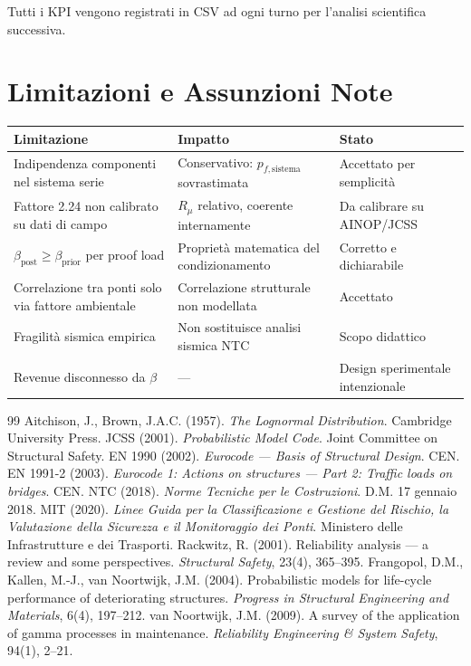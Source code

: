 \documentclass[11pt,a4paper]{article}
\begin{document}
Tutti i KPI vengono registrati in CSV ad ogni turno per l'analisi scientifica successiva.

\section{Limitazioni e Assunzioni Note}

\begin{center}
\begin{tabular}{p{4cm}p{5.5cm}p{3cm}}
\toprule
\textbf{Limitazione} & \textbf{Impatto} & \textbf{Stato} \\
\midrule
Indipendenza componenti nel sistema serie & Conservativo: $p_{f,\text{sistema}}$ sovrastimata & Accettato per semplicità \\
Fattore 2.24 non calibrato su dati di campo & $R_\mu$ relativo, coerente internamente & Da calibrare su AINOP/JCSS \\
$\beta_{\text{post}} \geq \beta_{\text{prior}}$ per proof load & Propriet\`a matematica del condizionamento & Corretto e dichiarabile \\
Correlazione tra ponti solo via fattore ambientale & Correlazione strutturale non modellata & Accettato \\
Fragilità sismica empirica & Non sostituisce analisi sismica NTC & Scopo didattico \\
Revenue disconnesso da $\beta$ & --- & Design sperimentale intenzionale \\
\bottomrule
\end{tabular}
\end{center}

\newpage
\begin{thebibliography}{99}
 Aitchison, J., Brown, J.A.C. (1957). \textit{The Lognormal Distribution}. Cambridge University Press.
 JCSS (2001). \textit{Probabilistic Model Code}. Joint Committee on Structural Safety.
 EN 1990 (2002). \textit{Eurocode --- Basis of Structural Design}. CEN.
 EN 1991-2 (2003). \textit{Eurocode 1: Actions on structures --- Part 2: Traffic loads on bridges}. CEN.
 NTC (2018). \textit{Norme Tecniche per le Costruzioni}. D.M. 17 gennaio 2018.
 MIT (2020). \textit{Linee Guida per la Classificazione e Gestione del Rischio, la Valutazione della Sicurezza e il Monitoraggio dei Ponti}. Ministero delle Infrastrutture e dei Trasporti.
 Rackwitz, R. (2001). Reliability analysis --- a review and some perspectives. \textit{Structural Safety}, 23(4), 365--395.
 Frangopol, D.M., Kallen, M.-J., van Noortwijk, J.M. (2004). Probabilistic models for life-cycle performance of deteriorating structures. \textit{Progress in Structural Engineering and Materials}, 6(4), 197--212.
 van Noortwijk, J.M. (2009). A survey of the application of gamma processes in maintenance. \textit{Reliability Engineering \& System Safety}, 94(1), 2--21.
\end{thebibliography}
\end{document}
